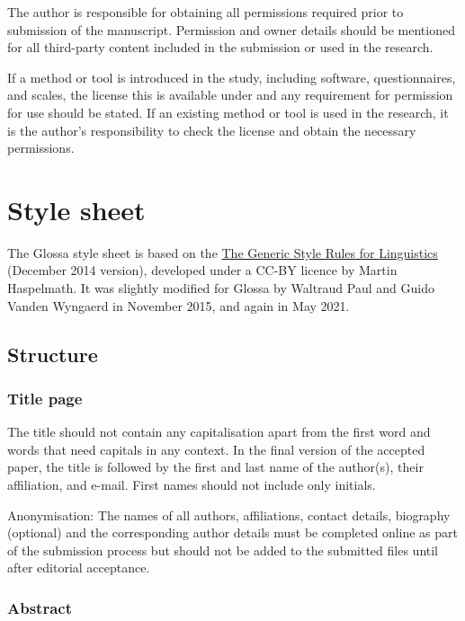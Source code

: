 \documentclass[charis,linguex]{glossa}
\begin{document}
The author is responsible for obtaining all permissions required prior to submission of the manuscript. Permission and owner details should be mentioned for all third-party content included in the submission or used in the research.

If a method or tool is introduced in the study, including software, questionnaires, and scales, the license this is available under and any requirement for permission for use should be stated. If an existing method or tool is used in the research, it is the author's responsibility to check the license and obtain the necessary permissions. %


\section{Style sheet}\label{ss}

The Glossa style sheet is based on the \href{http://www.eva.mpg.de/linguistics/past-research-resources/resources/generic-style-rules.html}{The Generic Style Rules for Linguistics} (December 2014 version), developed under a CC-BY licence by Martin Haspelmath. It was slightly modified for Glossa by Waltraud Paul and Guido Vanden Wyngaerd in November 2015, and again in May 2021.

\subsection{Structure}

\subsubsection{Title page}

The title should not contain any capitalisation apart from the first word and words that need capitals in any context. In the final version of the accepted paper, the title is followed by the first and last name of the author(s), their affiliation, and e-mail. First names should not include only initials.

Anonymisation: The names of all authors, affiliations, contact details, biography (optional) and the corresponding author details must be completed online as part of the submission process but should not be added to the submitted files until after editorial acceptance.

\subsubsection{Abstract}
\end{document}
